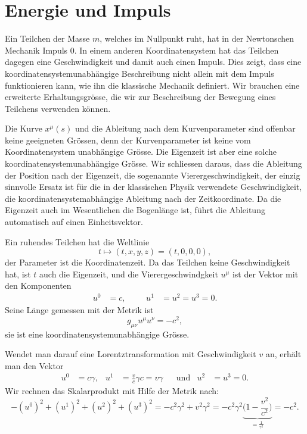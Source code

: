 \section{Energie und Impuls}
\label{skript:speziell:energieimpuls}
Ein Teilchen der Masse $m$, welches im Nullpunkt ruht, hat in der
Newtonschen Mechanik Impuls 0.
In einem anderen Koordinatensystem hat das Teilchen dagegen
eine Geschwindigkeit und damit auch einen Impuls.
Dies zeigt, dass eine koordinatensystemunabhängige Beschreibung
nicht allein mit dem Impuls funktionieren kann, wie ihn die klassische
Mechanik definiert.
Wir brauchen eine erweiterte Erhaltungsgrösse, die wir zur Beschreibung
der Bewegung eines Teilchens verwenden können.


Die Kurve $x^\mu(s)$ und die Ableitung nach dem Kurvenparameter sind
offenbar keine geeigneten Grössen, denn der Kurvenparameter ist
keine vom Koordinatensystem unabhängige Grösse.
Die Eigenzeit ist aber eine solche koordinatensystemunabhängige
Grösse.
Wir schliessen daraus, dass die Ableitung der Position
nach der Eigenzeit, die sogenannte Vierergeschwindigkeit, der einzig
sinnvolle Ersatz ist für die in der klassischen Physik verwendete
Geschwindigkeit, die koordinatensystemabhängige Ableitung nach der
Zeitkoordinate.
Da die Eigenzeit auch im Wesentlichen die Bogenlänge ist, führt die
Ableitung automatisch auf einen Einheitsvektor.

Ein ruhendes Teilchen hat die Weltlinie
\[
t\mapsto (t, x, y, z)=(t,0,0,0),
\]
der Parameter ist die Koordinatenzeit.
Da das Teilchen keine Geschwindigkeit hat, ist $t$ auch die Eigenzeit,
und die Vierergeschwindgkeit $u^\mu$ ist der Vektor mit den
Komponenten
\[
\begin{aligned}
u^0 &= c,
&&&
u^1&=u^2=u^3 = 0.
\end{aligned}
\]
Seine Länge gemessen mit der Metrik ist
\[
g_{\mu\nu}u^\mu u^\nu=-c^2,
\]
sie ist eine koordinatensystemunabhängige Grösse.

Wendet man darauf eine Lorentztransformation mit Geschwindigkeit $v$ an,
erhält man den Vektor
\[
\begin{aligned}
u^0
&=
c\gamma,
&
u^1
&=
\frac{v}{c}\gamma c
=v\gamma
&&\text{und}
&
u^2&=u^3=0.
\end{aligned}
\]
Wir rechnen das Skalarprodukt mit Hilfe der Metrik nach:
\[
-(u^0)^2 + (u^1)^2 + (u^2)^2 + (u^3)^2
=
-c^2\gamma^2 + v^2\gamma^2
=
-c^2\gamma^2
\underbrace{\biggl(1-\frac{v^2}{c^2}\biggr)}_{\displaystyle=\frac{1}{\gamma^2}}
=
-c^2.
\]


